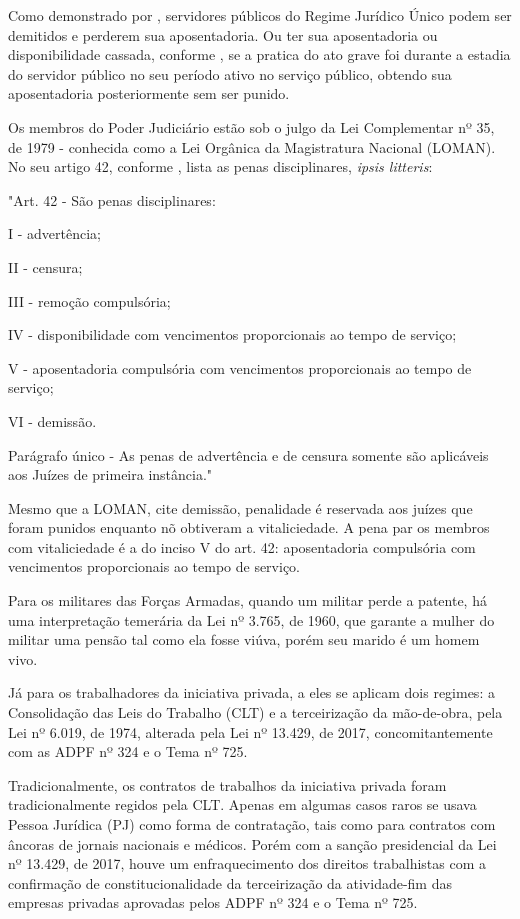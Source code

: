 Como demonstrado por \cite{l8112}, servidores públicos do Regime Jurídico Único podem ser demitidos e perderem sua aposentadoria. Ou ter sua aposentadoria ou disponibilidade cassada, conforme \cite{adpf418}, se a pratica do ato grave foi durante a estadia do servidor público no  seu período ativo no serviço público, obtendo sua aposentadoria posteriormente sem ser punido. 

Os membros do Poder Judiciário estão sob o julgo da Lei Complementar nº 35, de 1979 - conhecida como a Lei Orgânica da Magistratura Nacional (LOMAN). No seu artigo 42, conforme \cite{lcp35}, lista as penas disciplinares, \textit{ipsis litteris}:

\noindent
\begin{flushleft}
	\setlength{\leftskip}{4cm}
	\small
	"Art. 42 - São penas disciplinares:
	
	I - advertência;
	
	II - censura;
	
	III - remoção compulsória;
	
	IV - disponibilidade com vencimentos proporcionais ao tempo de serviço;
	
	V - aposentadoria compulsória com vencimentos proporcionais ao tempo de serviço;
	
	VI - demissão.
	
	Parágrafo único - As penas de advertência e de censura somente são aplicáveis aos Juízes de primeira instância." \cite{lcp35}
\end{flushleft}

Mesmo que a LOMAN, cite demissão,  penalidade é reservada aos juízes que foram punidos enquanto nõ obtiveram a vitaliciedade. A pena par os membros com vitaliciedade é a do inciso V do art. 42: aposentadoria compulsória com vencimentos proporcionais ao tempo de serviço.

Para os militares das Forças Armadas, quando um militar perde a patente, há uma interpretação temerária da Lei nº 3.765, de 1960, que garante a mulher do militar uma pensão tal como ela fosse viúva, porém seu marido é um homem vivo.

Já para os trabalhadores da iniciativa privada, a eles se aplicam dois regimes: a Consolidação das Leis do Trabalho (CLT) e a terceirização da mão-de-obra, pela Lei nº 6.019, de 1974, alterada pela Lei nº 13.429, de 2017, concomitantemente com as ADPF nº 324 e o Tema nº 725.

Tradicionalmente, os contratos de trabalhos da iniciativa privada foram tradicionalmente regidos pela CLT. Apenas em algumas casos raros se usava Pessoa Jurídica (PJ) como forma de contratação, tais como para contratos com âncoras de jornais nacionais e médicos. Porém com a sanção presidencial da Lei nº 13.429, de 2017, houve um enfraquecimento dos direitos trabalhistas com a confirmação de constitucionalidade da terceirização da atividade-fim das empresas privadas aprovadas pelos ADPF nº 324 e o Tema nº 725.

